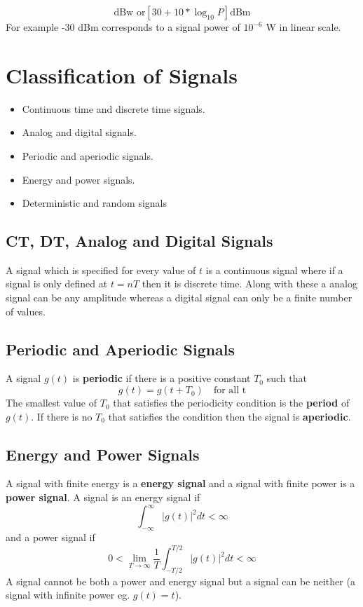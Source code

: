 \documentclass{article}
\begin{document}
    \begin{equation}
        [10 * \log_{10} P] \textrm{dBw or} [30 + 10 * \log_{10} P] \textrm{dBm}
    \end{equation}
    For example -30 dBm corresponds to a signal power of $10^{-6}$ W in linear scale.

    \section{Classification of Signals}
    \begin{itemize}
        \item Continuous time and discrete time signals.
        \item Analog and digital signals.
        \item Periodic and aperiodic signals.
        \item Energy and power signals.
        \item Deterministic and random signals
    \end{itemize}

    \subsection{CT, DT, Analog and Digital Signals}
    A signal which is specified for every value of $t$ is a continuous signal where if a signal is only defined at $t = nT$ then it is discrete time. Along with these
    a analog signal can be any amplitude whereas a digital signal can only be a finite number of values.

    \subsection{Periodic and Aperiodic Signals}
    A signal $g(t)$ is \textbf{periodic} if there is a positive constant $T_0$ such that
    \begin{equation}
        g(t) = g(t + T_0) \quad \textrm{for all t}
    \end{equation}
    The smallest value of $T_0$ that satisfies the periodicity condition is the \textbf{period} of $g(t)$. If there is no $T_0$ that satisfies the condition
    then the signal is \textbf{aperiodic}.

    \subsection{Energy and Power Signals}
    A signal with finite energy is a \textbf{energy signal} and a signal with finite power is a \textbf{power signal}. A signal is an energy signal if
    \begin{equation}
        \int_{-\infty}^{\infty}|g(t)|^2dt < \infty
    \end{equation}
    and a power signal if
    \begin{equation}
        0 < \lim_{T \rightarrow \infty} \frac{1}{T} \int_{-T/2}^{T/2} |g(t)|^2dt < \infty
    \end{equation}
    A signal cannot be both a power and energy signal but a signal can be neither (a signal with infinite power eg. $g(t) = t$).
\end{document}
